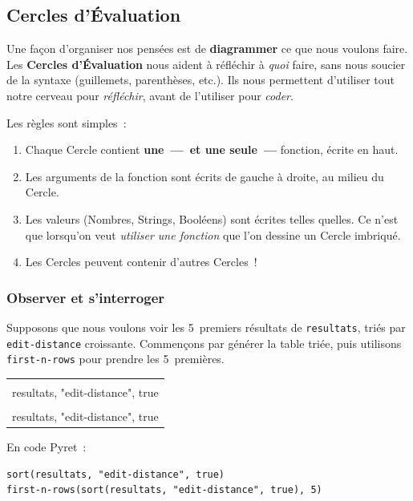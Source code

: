 \documentclass[12pt,a4paper]{article}
\newcommand{\cercle}[2]{%
  \begin{tikzpicture}[baseline=-0.5ex]
    \node[draw=bsblue, thick, fill=bsblue!8, rounded corners=6pt,
          inner xsep=3pt, inner ysep=2pt, align=center,
          font=\ttfamily\scriptsize, text=black]
      {\textbf{\color{bsblue}#1}\\[0pt]#2};
  \end{tikzpicture}%
}
\newcommand{\cercleN}[2]{%
  \begin{tikzpicture}[baseline=-0.5ex]
    \node[draw=bsblue, thick, fill=bsblue!8, rounded corners=8pt,
          inner sep=8pt, align=center,
          font=\ttfamily\scriptsize, text=black]
      {\textbf{\color{bsblue}#1}\\[6pt]#2};
  \end{tikzpicture}%
}
\begin{document}
\subsection{Cercles d'Évaluation}

Une façon d'organiser nos pensées est de \textbf{diagrammer} ce que nous voulons faire. Les \textbf{Cercles d'Évaluation} nous aident à réfléchir à \emph{quoi} faire, sans nous soucier de la syntaxe (guillemets, parenthèses, etc.). Ils nous permettent d'utiliser tout notre cerveau pour \emph{réfléchir}, avant de l'utiliser pour \emph{coder}.

Les règles sont simples~:
\begin{enumerate}[leftmargin=*]
  \item Chaque Cercle contient \textbf{une~—~et une seule~—} fonction, écrite en haut.
  \item Les arguments de la fonction sont écrits de gauche à droite, au milieu du Cercle.
  \item Les valeurs (Nombres, Strings, Booléens) sont écrites telles quelles. Ce n'est que lorsqu'on veut \emph{utiliser une fonction} que l'on dessine un Cercle imbriqué.
  \item Les Cercles peuvent contenir d'autres Cercles~!
\end{enumerate}

\subsubsection{Observer et s'interroger}

Supposons que nous voulons voir les 5~premiers résultats de \texttt{resultats}, triés par \texttt{edit-distance} croissante. Commençons par générer la table triée, puis utilisons \texttt{first\allowbreak-n\allowbreak-rows} pour prendre les 5~premières.

\begin{center}
  \begin{tabular}{@{}c@{}}
    \cercle{sort}{resultats, "edit\allowbreak-distance", true}%
    \hspace{1em}$\to$\hspace{1em}%
    \cercleN{first-n-rows}{\cercle{sort}{resultats, "edit\allowbreak-distance", true}, 5}
  \end{tabular}
\end{center}

En code Pyret~:
\begin{lstlisting}
sort(resultats, "edit-distance", true)
first-n-rows(sort(resultats, "edit-distance", true), 5)
\end{lstlisting}
\end{document}
